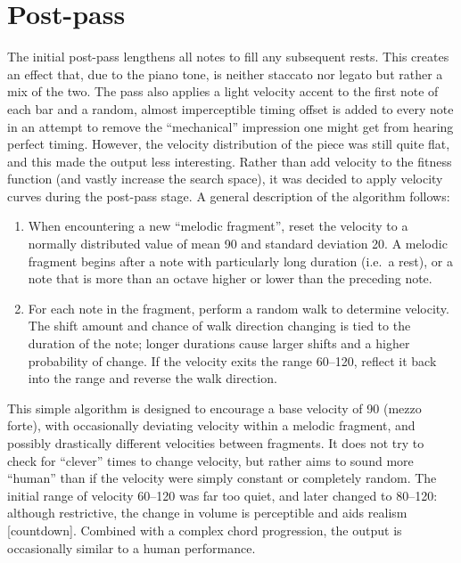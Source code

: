 \section{Post-pass}

The initial post-pass lengthens all notes to fill any subsequent rests. This creates an effect that, due to the piano tone, is neither staccato nor legato but rather a mix of the two. The pass also applies a light velocity accent to the first note of each bar and a random, almost imperceptible timing offset is added to every note in an attempt to remove the ``mechanical'' impression one might get from hearing perfect timing. However, the velocity distribution of the piece was still quite flat, and this made the output less interesting. Rather than add velocity to the fitness function (and vastly increase the search space), it was decided to apply velocity curves during the post-pass stage. A general description of the algorithm follows:

\begin{enumerate}
\item When encountering a new ``melodic fragment'', reset the velocity to a normally distributed value of mean 90 and standard deviation 20. A melodic fragment begins after a note with particularly long duration (i.e.\ a rest), or a note that is more than an octave higher or lower than the preceding note.
\item For each note in the fragment, perform a random walk to determine velocity. The shift amount and chance of walk direction changing is tied to the duration of the note; longer durations cause larger shifts and a higher probability of change. If the velocity exits the range 60--120, reflect it back into the range and reverse the walk direction.
\end{enumerate}

This simple algorithm is designed to encourage a base velocity of 90 (mezzo forte), with occasionally deviating velocity within a melodic fragment, and possibly drastically different velocities between fragments. It does not try to check for ``clever'' times to change velocity, but rather aims to sound more ``human'' than if the velocity were simply constant or completely random. The initial range of velocity 60--120 was far too quiet, and later changed to 80--120: although restrictive, the change in volume is perceptible and aids realism [countdown]. Combined with a complex chord progression, the output is occasionally similar to a human performance.

